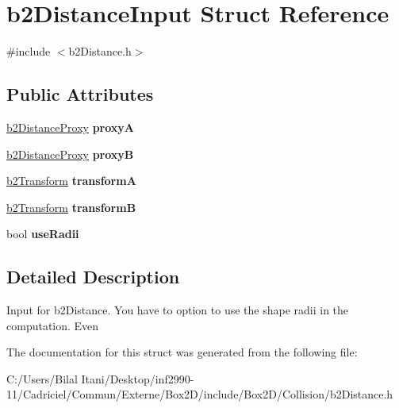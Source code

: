 \hypertarget{structb2_distance_input}{}\section{b2\+Distance\+Input Struct Reference}
\label{structb2_distance_input}


{\ttfamily \#include $<$b2\+Distance.\+h$>$}

\subsection*{Public Attributes}
\begin{DoxyCompactItemize}
\item 
\hyperlink{structb2_distance_proxy}{b2\+Distance\+Proxy} {\bfseries proxyA}\hypertarget{structb2_distance_input_a84d378f4f0e2f06fbe03d413e9dfbbd9}{}\label{structb2_distance_input_a84d378f4f0e2f06fbe03d413e9dfbbd9}

\item 
\hyperlink{structb2_distance_proxy}{b2\+Distance\+Proxy} {\bfseries proxyB}\hypertarget{structb2_distance_input_ad08521a9cdf9d418ececfd44de83a5d3}{}\label{structb2_distance_input_ad08521a9cdf9d418ececfd44de83a5d3}

\item 
\hyperlink{structb2_transform}{b2\+Transform} {\bfseries transformA}\hypertarget{structb2_distance_input_a0889c2f7120ba521d6e40e2a22834ddb}{}\label{structb2_distance_input_a0889c2f7120ba521d6e40e2a22834ddb}

\item 
\hyperlink{structb2_transform}{b2\+Transform} {\bfseries transformB}\hypertarget{structb2_distance_input_a47352d7c5b3db80b2fb8cf338f1c1895}{}\label{structb2_distance_input_a47352d7c5b3db80b2fb8cf338f1c1895}

\item 
bool {\bfseries use\+Radii}\hypertarget{structb2_distance_input_ab72a770be4a91997d00112409de5fea7}{}\label{structb2_distance_input_ab72a770be4a91997d00112409de5fea7}

\end{DoxyCompactItemize}


\subsection{Detailed Description}
Input for b2\+Distance. You have to option to use the shape radii in the computation. Even 

The documentation for this struct was generated from the following file\+:\begin{DoxyCompactItemize}
\item 
C\+:/\+Users/\+Bilal Itani/\+Desktop/inf2990-\/11/\+Cadriciel/\+Commun/\+Externe/\+Box2\+D/include/\+Box2\+D/\+Collision/b2\+Distance.\+h\end{DoxyCompactItemize}
